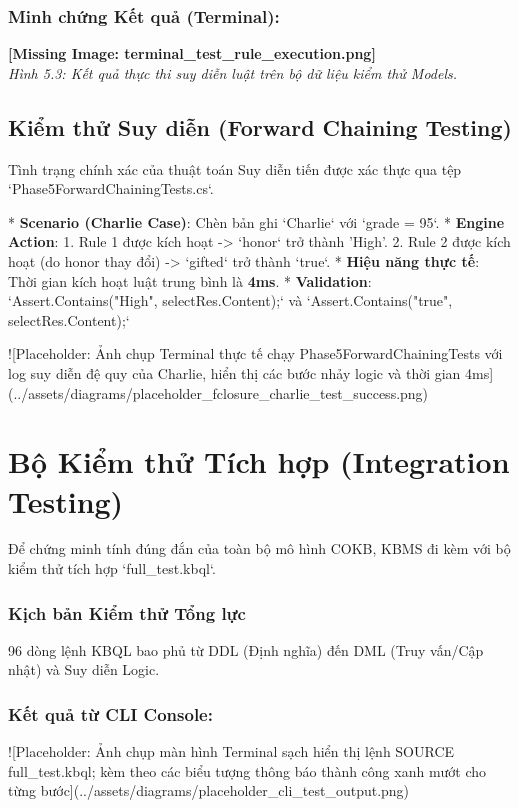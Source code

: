 \subsubsection{Minh chứng Kết quả (Terminal):}
\textbf{[Missing Image: terminal_test_rule_execution.png]}\\ \textit{Hình 5.3: Kết quả thực thi suy diễn luật trên bộ dữ liệu kiểm thử Models.}

\subsection{Kiểm thử Suy diễn (Forward Chaining Testing)}

Tình trạng chính xác của thuật toán Suy diễn tiến được xác thực qua tệp `Phase5ForwardChainingTests.cs`.

*   \textbf{Scenario (Charlie Case)}: Chèn bản ghi `Charlie` với `grade = 95`.
*   \textbf{Engine Action}: 
    1. Rule 1 được kích hoạt -> `honor` trở thành 'High'.
    2. Rule 2 được kích hoạt (do honor thay đổi) -> `gifted` trở thành `true`.
*   \textbf{Hiệu năng thực tế}: Thời gian kích hoạt luật trung bình là \textbf{4ms}.
*   \textbf{Validation}: `Assert.Contains("High", selectRes.Content);` và `Assert.Contains("true", selectRes.Content);`

![Placeholder: Ảnh chụp Terminal thực tế chạy Phase5ForwardChainingTests với log suy diễn đệ quy của Charlie, hiển thị các bước nhảy logic và thời gian 4ms](../assets/diagrams/placeholder\_fclosure\_charlie\_test\_success.png)

\section{Bộ Kiểm thử Tích hợp (Integration Testing)}

Để chứng minh tính đúng đắn của toàn bộ mô hình COKB, KBMS đi kèm với bộ kiểm thử tích hợp `full\_test.kbql`.

\subsubsection{Kịch bản Kiểm thử Tổng lực}
96 dòng lệnh KBQL bao phủ từ DDL (Định nghĩa) đến DML (Truy vấn/Cập nhật) và Suy diễn Logic.

\subsubsection{Kết quả từ CLI Console:}

![Placeholder: Ảnh chụp màn hình Terminal sạch hiển thị lệnh SOURCE full\_test.kbql; kèm theo các biểu tượng thông báo thành công xanh mướt cho từng bước](../assets/diagrams/placeholder\_cli\_test\_output.png)

